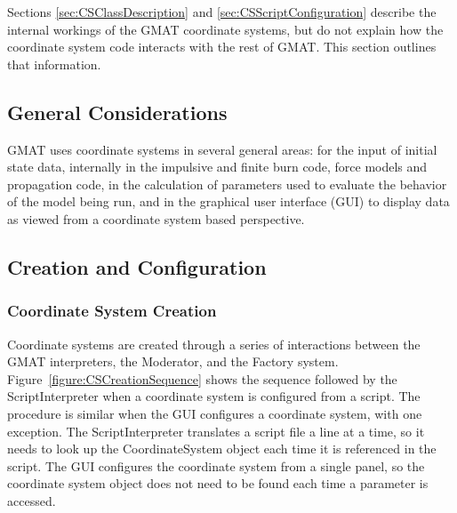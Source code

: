 Sections \ref{sec:CSClassDescription} and \ref{sec:CSScriptConfiguration} describe the internal
workings of the GMAT coordinate systems, but do not explain how the coordinate system code interacts
with the rest of GMAT. This section outlines that information.


\subsection{General Considerations}

GMAT uses coordinate systems in several general areas: for the input of initial state data,
internally in the impulsive and finite burn code, force models and propagation code, in the
calculation of parameters used to evaluate the behavior of the model being run, and in the graphical
user interface (GUI) to display data as viewed from a coordinate system based perspective.

\subsection{Creation and Configuration}

\subsubsection{Coordinate System Creation}

Coordinate systems are created through a series of interactions between the GMAT interpreters, the
Moderator, and the Factory system. Figure~\ref{figure:CSCreationSequence} shows the sequence
followed by the ScriptInterpreter when a coordinate system is configured from a script.  The
procedure is similar when the GUI configures a coordinate system, with one exception. The
ScriptInterpreter translates a script file a line at a time, so it needs to look up the
CoordinateSystem object each time it is referenced in the script. The GUI configures the coordinate
system from a single panel, so the coordinate system object does not need to be found each time a
parameter is accessed.

